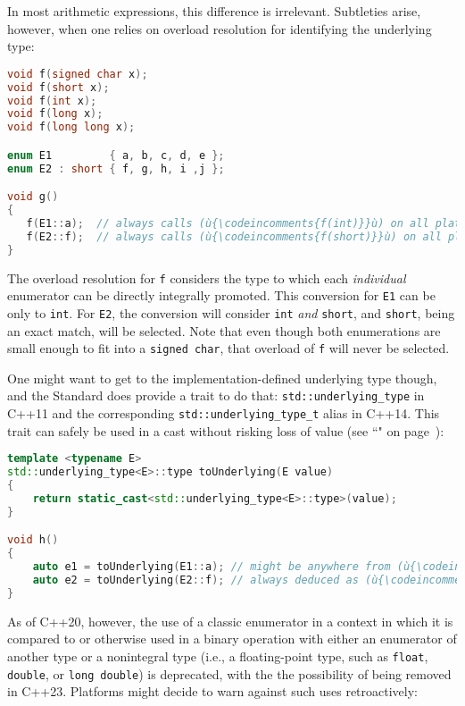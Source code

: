 In most arithmetic expressions, this difference is irrelevant.
Subtleties arise, however, when one relies on overload resolution for
identifying the underlying type:

\begin{lstlisting}[language=C++]
void f(signed char x);
void f(short x);
void f(int x);
void f(long x);
void f(long long x);

enum E1         { a, b, c, d, e };
enum E2 : short { f, g, h, i ,j };

void g()
{
   f(E1::a);  // always calls (ù{\codeincomments{f(int)}}ù) on all platforms
   f(E2::f);  // always calls (ù{\codeincomments{f(short)}}ù) on all platforms
}
\end{lstlisting}

\noindent The overload resolution for \texttt{f} considers the type to which each
\emph{individual} enumerator can be directly integrally promoted. This
conversion for \texttt{E1} can be only to \texttt{int}. For \texttt{E2},
the conversion will consider \texttt{int} \emph{and} \texttt{short}, and
\texttt{short}, being an exact match, will be selected. Note that even
though both enumerations are small enough to fit into a
\texttt{signed}~\texttt{char}, that overload of \texttt{f} will never be
selected.

One might want to get to the implementation-defined underlying type
though, and the Standard does provide a trait to do that:
\texttt{std::underlying\_type} in C++11 and the corresponding
\texttt{std::underlying\_type\_t} alias in C++14. This trait can safely
be used in a cast without risking loss of value (see
  ``" on page~\pageref{auto}):

\begin{lstlisting}[language=C++]
template <typename E>
std::underlying_type<E>::type toUnderlying(E value)
{
    return static_cast<std::underlying_type<E>::type>(value);
}

void h()
{
    auto e1 = toUnderlying(E1::a); // might be anywhere from (ù{\codeincomments{signed char}}ù) to (ù{\codeincomments{int}}ù)
    auto e2 = toUnderlying(E2::f); // always deduced as (ù{\codeincomments{short}}ù)
}
\end{lstlisting}

\noindent As of C++20, however, the use of a classic enumerator in a context in
which it is compared to or otherwise used in a binary operation with
either an enumerator of another type or a nonintegral type (i.e., a
floating-point type, such as \texttt{float}, \texttt{double}, or
\texttt{long}~\texttt{double}) is deprecated, with the the possibility
of being removed in C++23. Platforms might decide to warn against such
uses retroactively:

